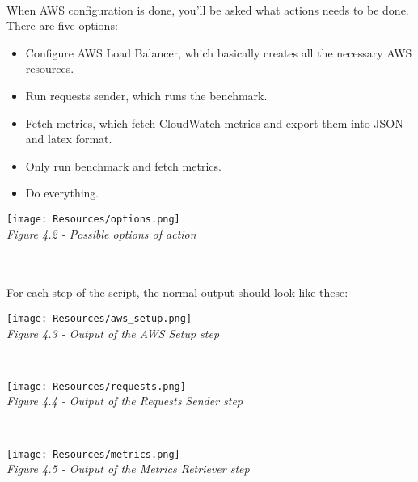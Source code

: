 \paragraph{}When AWS configuration is done, you'll be asked what actions needs to be done. There are five options:
\begin{itemize}
  \item Configure AWS Load Balancer, which basically creates all the necessary AWS resources.
  \item Run requests sender, which runs the benchmark.
  \item Fetch metrics, which fetch CloudWatch metrics and export them into JSON and latex format.
  \item Only run benchmark and fetch metrics.
  \item Do everything.
\end{itemize}

\begin{center}
\texttt{[image: Resources/options.png]}\\
\emph{Figure 4.2 - Possible options of action}
\end{center}\\

\lef\paragraph{}For each step of the script, the normal output should look like these:

\begin{center}\centering\texttt{[image: Resources/aws\_setup.png]}\\\emph{Figure 4.3 - Output of the AWS Setup step}\end{center}\\
\begin{center}\centering\texttt{[image: Resources/requests.png]}\\\emph{Figure 4.4 - Output of the Requests Sender step}\end{center}\\
\begin{center}\centering\texttt{[image: Resources/metrics.png]}\\\emph{Figure 4.5 - Output of the Metrics Retriever step}\end{center}\\